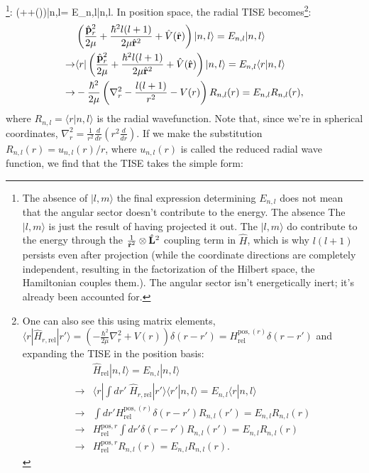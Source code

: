 \footnote{
The absence of $|l,m\rangle$ the final expression determining $E_{n,l}$ does not mean that the angular sector doesn't contribute to the energy. The absence The $|l,m\rangle$ is just the result of having projected it out. The $|l,m\rangle$ do contribute to the energy through the $\frac{1}{\hat{\mathbf{r}}^2}\otimes\hat{\mathbf{L}}^2$ coupling term in $\hat{H}$, which is why $l(l+1)$ persists even after projection (while the coordinate directions are completely independent, resulting in the factorization of the Hilbert space, the Hamiltonian couples them.). The angular sector isn't energetically inert; it's already been accounted for.
}:
\be
    \left(++()\right)|n,l\rangle = E_{n,l}|n,l\rangle.
\ee
In position space, the radial TISE becomes\footnote{
One can also see this using matrix elements, $\langle r|\hat{H}_{r,\text{rel}}|r'\rangle =\left(-\frac{\hbar^2}{2\mu}\nabla^2_r+V(r)\right)\delta(r-r')=H^{\text{pos},(r)}_{\text{rel}}\delta({r}-{r}')$ and expanding the TISE in the position basis:
\begin{align*}
    &\hat{H}_\text{rel}|n,l\rangle = E_{n,l}|n,l\rangle\\
    \rightarrow& \langle r|\int dr'\; \hat{H}_{r,\text{rel}}|{r}'\rangle\langle {r}'|n,l\rangle =E_{n,l}\langle {r}|n,l\rangle\\
    \rightarrow& \int dr'H^{\text{pos},({r})}_{\text{rel}} \delta({r}-{r}')R_{n,l}({r}') = E_{n,l}R_{n,l}({r})\\
    \rightarrow&H_{\text{rel}}^{\text{pos},{r}}\int dr' \delta({r}-{r}')R_{n,l}({r}')=E_{n,l}R_{n,l}({r}) \\ 
    \rightarrow& H^{\text{pos},r}_\text{rel}R_{n,l}({r}) = E_{n,l}R_{n,l}({r}).
\end{align*}
}:
\begin{align*}
    &\left(\frac{\hat{\mathbf{p}}_r^2}{2\mu}+\frac{\hbar^2l(l+1)}{2\mu\hat{\mathbf{r}}^2}+\hat{V}(\hat{\mathbf{r}})\right)|n,l\rangle = E_{n,l}|n,l\rangle\\
    \rightarrow&\langle r|\left(\frac{\hat{\mathbf{p}}_r^2}{2\mu}+\frac{\hbar^2l(l+1)}{2\mu\hat{\mathbf{r}}^2}+\hat{V}(\hat{\mathbf{r}})\right)|n,l\rangle = E_{n,l}\langle r|n,l\rangle\\
    \rightarrow& -\frac{\hbar^2}{2\mu}\left(\nabla_r^2-\frac{l(l+1)}{r^2}-V(r)  \right)R_{n,l}(r) = E_{n,l}R_{n,l}(r),\\
\end{align*}
where $R_{n,l}=\langle r|n,l\rangle$ is the radial wavefunction. Note that, since we're in spherical coordinates, $\nabla_r^2=\frac{1}{r^2}\frac{d}{dr}(r^2\frac{d}{dr})$. If we make the substitution $R_{n,l}(r)=u_{n,l}(r)/r$, where $u_{n,l}(r)$ is called the reduced radial wave function, we find that the TISE takes the simple form:

